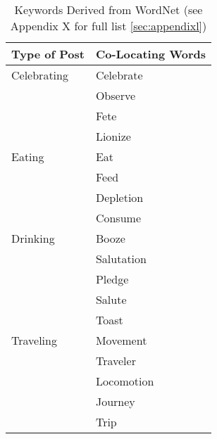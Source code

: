 \clearpage
\begin{table}[ph!]   %
	\centering
	\caption{Keywords Derived from WordNet (see Appendix X for full list \ref{sec:appendixl})} \vspace{0.25em}
	\begin{tabular}{|p{1.5in}|p{2in}|} \hline
		\centering Type of Post & Co-Locating Words \\ \hline
		Celebrating 
			& Celebrate \\
			& Observe\\
			& Fete\\
			& Lionize
		\\ \hline
		Eating 
			& Eat\\
			& Feed\\
			& Depletion\\
			& Consume 
		 \\ \hline
		Drinking 
			& Booze\\
			& Salutation\\
			& Pledge\\
			& Salute\\
			& Toast
		 \\ \hline
		Traveling
			& Movement\\
			& Traveler\\
			& Locomotion\\
			& Journey\\
			& Trip\\\hline
	\end{tabular}
	\label{tab:EventClassificationWordNet}
\end{table}
\clearpage
